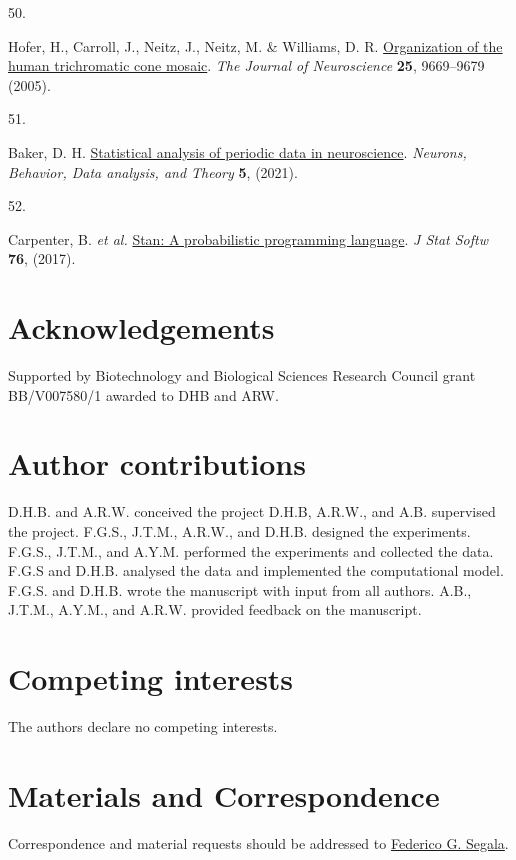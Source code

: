 \documentclass[
]{article}
\newlength{\cslhangindent}
\newlength{\csllabelwidth}
\newenvironment{CSLReferences}[2] %
 {\begin{list}{}{%
  \setlength{\itemindent}{0pt}
  \setlength{\leftmargin}{0pt}
  \setlength{\parsep}{0pt}
  \ifodd #1
   \setlength{\leftmargin}{\cslhangindent}
   \setlength{\itemindent}{-1\cslhangindent}
  \fi
  \setlength{\itemsep}{#2\baselineskip}}}
 {\end{list}}
\newcommand{\CSLLeftMargin}[1]{\parbox[t]{\csllabelwidth}{\strut#1\strut}}
\newcommand{\CSLRightInline}[1]{\parbox[t]{\linewidth - \csllabelwidth}{\strut#1\strut}}
\begin{document}
\begin{CSLReferences}{0}{0}
\CSLLeftMargin{50. }%
\CSLRightInline{Hofer, H., Carroll, J., Neitz, J., Neitz, M. \& Williams, D. R. \href{https://doi.org/10.1523/jneurosci.2414-05.2005}{Organization of the human trichromatic cone mosaic}. \emph{The Journal of Neuroscience} \textbf{25}, 9669--9679 (2005).}

\CSLLeftMargin{51. }%
\CSLRightInline{Baker, D. H. \href{https://doi.org/10.51628/001c.27680}{Statistical analysis of periodic data in neuroscience}. \emph{Neurons, Behavior, Data analysis, and Theory} \textbf{5}, (2021).}

\CSLLeftMargin{52. }%
\CSLRightInline{Carpenter, B. \emph{et al.} \href{https://doi.org/10.18637/jss.v076.i01}{Stan: A probabilistic programming language}. \emph{J Stat Softw} \textbf{76}, (2017).}

\end{CSLReferences}

\section{Acknowledgements}\label{acknowledgements}

Supported by Biotechnology and Biological Sciences Research Council grant BB/V007580/1 awarded to DHB and ARW.

\section{Author contributions}\label{author-contributions}

D.H.B. and A.R.W. conceived the project D.H.B, A.R.W., and A.B. supervised the project. F.G.S., J.T.M., A.R.W., and D.H.B. designed the experiments. F.G.S., J.T.M., and A.Y.M. performed the experiments and collected the data. F.G.S and D.H.B. analysed the data and implemented the computational model. F.G.S. and D.H.B. wrote the manuscript with input from all authors. A.B., J.T.M., A.Y.M., and A.R.W. provided feedback on the manuscript.

\section{Competing interests}\label{competing-interests}

The authors declare no competing interests.

\section{Materials and Correspondence}\label{materials-and-correspondence}

Correspondence and material requests should be addressed to \href{federico.segala@york.ac.uk}{Federico G. Segala}.
\end{document}
